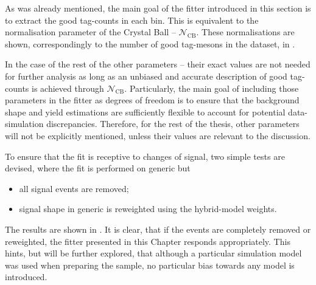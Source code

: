 As was already mentioned, the main goal of the \Mbc fitter introduced in this section is to extract the good tag-\B counts in each \EB bin.
This is equivalent to the normalisation parameter of the Crystal Ball \PDF -- $\mathcal{N}_{\mathrm{CB}}$.
These normalisations are shown, correspondingly to the number of good tag-\B mesons in the dataset, in .

In the case of the rest of the other parameters -- their exact values are not needed for further analysis as long as an unbiased and accurate description of good tag-\B counts is achieved through $\mathcal{N}_{\mathrm{CB}}$.
Particularly, the main goal of including those parameters in the fitter as degrees of freedom is to ensure that the \Mbc background shape and yield estimations are sufficiently flexible to account for potential data-simulation discrepancies.
Therefore, for the rest of the thesis, other parameters will not be explicitly mentioned, unless their values are relevant to the discussion.

To ensure that the fit is receptive to changes of \BtoXsgamma signal, two simple tests are devised, where the fit is performed on generic \MC but
\begin{itemize}
    \item all \BtoXsgamma signal events are removed;
    \item \BtoXsgamma signal shape in generic \MC is reweighted using the hybrid-model weights.
\end{itemize}
The results are shown in .
It is clear, that if the \BtoXsgamma events are completely removed or reweighted, the \Mbc fitter presented in this Chapter responds appropriately.
This hints, but will be further explored, that although a particular simulation model was used when preparing the sample, no particular bias towards any \BtoXsgamma model is introduced.

